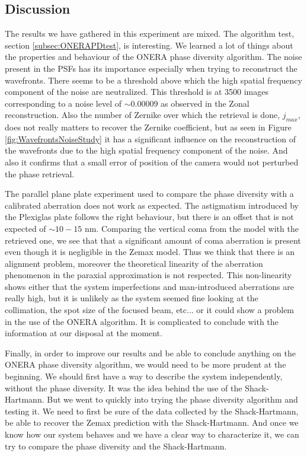 \subsection{Discussion}
\label{subsec:DiscussionOnera}

The results we have gathered in this experiment are mixed. The algorithm test, section \ref{subsec:ONERAPDtest}, is interesting. We learned a lot of things about the properties and behaviour of the ONERA phase diversity algorithm. The noise present in the PSFs has its importance especially when trying to reconstruct the wavefronts. There seems to be a threshold above which the high spatial frequency component of the noise are neutralized. This threshold is at 3500 images corresponding to a noise level of $\sim0.00009$ as observed in the Zonal reconstruction. Also the number of Zernike over which the retrieval is done, $j_{max}$, does not really matters to recover the Zernike coefficient, but as seen in Figure \ref{fig:WavefrontsNoiseStudy} it has a significant influence on the reconstruction of the wavefronts due to the high spatial frequency component of the noise. And also it confirms that a small error of position of the camera would not perturbed the phase retrieval. 

The parallel plane plate experiment used to compare the phase diversity with a calibrated aberration does not work as expected. The astigmatism introduced by the Plexiglas plate follows the right behaviour, but there is an offset that is not expected of $\sim 10-15$ nm. Comparing the vertical coma from the model with the retrieved one, we see that that a significant amount of coma aberration is present even though it is negligible in the Zemax model. Thus we think that there is an alignment problem, moreover the theoretical linearity of the aberration phenomenon in the paraxial approximation is not respected. This non-linearity shows either that the system imperfections and man-introduced aberrations are really high, but it is unlikely as the system seemed fine looking at the collimation, the spot size of the focused beam, etc... or it could show a problem in the use of the ONERA algorithm. It is complicated to conclude with the information at our disposal at the moment.

Finally, in order to improve our results and be able to conclude anything on the ONERA phase diversity algorithm, we would need to be more prudent at the beginning. We should first have a way to describe the system independently, without the phase diversity. It was the idea behind the use of the Shack-Hartmann. But we went to quickly into trying the phase diversity algorithm and testing it. We need to first be sure of the data collected by the Shack-Hartmann, be able to recover the Zemax prediction with the Shack-Hartmann. And once we know how our system behaves and we have a clear way to characterize it, we can try to compare the phase diversity and the Shack-Hartmann.

